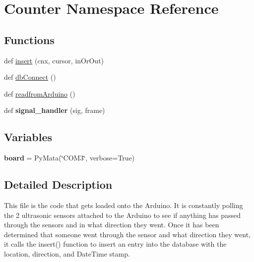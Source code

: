 \hypertarget{namespace_counter}{}\section{Counter Namespace Reference}
\label{namespace_counter}
\subsection*{Functions}
\begin{DoxyCompactItemize}
\item 
def \hyperlink{namespace_counter_a49e12affeadafd8435a97b06057e2dfe}{insert} (cnx, cursor, in\+Or\+Out)
\item 
def \hyperlink{namespace_counter_a8e429790189b662dee33d000087cb1f8}{db\+Connect} ()
\item 
def \hyperlink{namespace_counter_a27dffb0b62e84c35f52de71e22b3ee2f}{readfrom\+Arduino} ()
\item 
def {\bfseries signal\+\_\+handler} (sig, frame)\hypertarget{namespace_counter_abd6cd9e7a4e8224f96c5d38e18db6291}{}\label{namespace_counter_abd6cd9e7a4e8224f96c5d38e18db6291}

\end{DoxyCompactItemize}
\subsection*{Variables}
\begin{DoxyCompactItemize}
\item 
{\bfseries board} = Py\+Mata(\char`\"{}C\+O\+M3\char`\"{}, verbose=True)\hypertarget{namespace_counter_a270588806e1d16ef8beae527f6438f20}{}\label{namespace_counter_a270588806e1d16ef8beae527f6438f20}

\end{DoxyCompactItemize}


\subsection{Detailed Description}
\begin{DoxyVerb}This file is the code that gets loaded onto the Arduino. It is constantly polling the 2 
ultrasonic sensors attached to the Arduino to see if anything has passed through the sensors
and in what direction they went. Once it has been determined that someone went through the 
sensor and what direction they went, it calls the insert() function to insert an entry into 
the database with the location, direction, and DateTime stamp.
\end{DoxyVerb}
 

